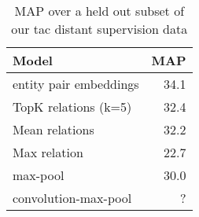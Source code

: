 \begin{table}[h!]
\setlength{\tabcolsep}{4.1pt}
\begin{center}
\begin{tabular}{|lr|}
\hline
\bf Model & MAP \\
\hline\hline
entity pair embeddings      & 34.1 \\
TopK relations (k=5)       & 32.4  \\
Mean relations              & 32.2 \\
Max relation                & 22.7  \\
max-pool                    & 30.0 \\
convolution-max-pool        & ? \\
\hline

\hline
\end{tabular}
\caption{MAP over a held out subset of our tac distant supervision data
\label{distant-supervision-table}}
\end{center}
\vspace{-.3cm}
\end{table}


%
